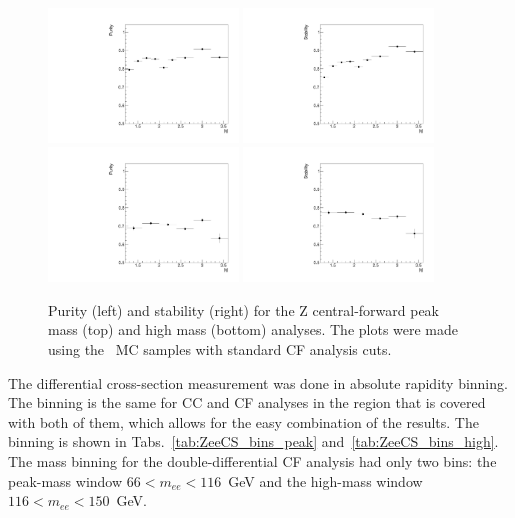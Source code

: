 \begin{figure}
  \centering
  \includegraphics[width=0.45\textwidth]{figures/ZCF_purity_peak}
  \includegraphics[width=0.45\textwidth]{figures/ZCF_stability_peak} \\
  \includegraphics[width=0.45\textwidth]{figures/ZCF_purity_high}
  \includegraphics[width=0.45\textwidth]{figures/ZCF_stability_high} \\
  \caption{Purity (left) and stability (right) for the Z central-forward peak mass (top) and high mass (bottom) analyses. The plots were made using the \Zee\ MC samples with standard CF analysis cuts.}
  \label{fig:ZeeCS_purity_stability}
\end{figure}

The differential cross-section measurement was done in absolute rapidity binning.
The binning is the same for CC and CF analyses in the region that is covered with both of them, which allows for the easy combination of the results. The binning is shown in Tabs.~\ref{tab:ZeeCS_bins_peak} and~\ref{tab:ZeeCS_bins_high}. The mass binning for the double-differential CF analysis had only two bins: the peak-mass window $66 < m_{ee} < 116$~GeV and the high-mass window $116 < m_{ee} < 150$~GeV.

